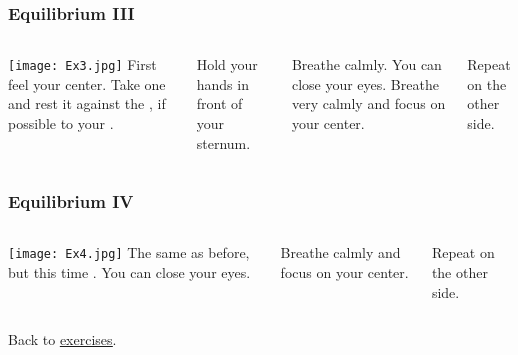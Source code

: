 \begin{frame}
\frametitle{Equilibrium III}


\begin{columns}[c] %
\texttt{[image: Ex3.jpg]}
First feel your center. Take one  
and rest it against the , if possible to your .

Hold your hands in front of your sternum.

Breathe calmly. You can close your eyes. Breathe very calmly and focus on your center.

Repeat on the other side.
\end{columns}
\end{frame}
\begin{frame}
\frametitle{Equilibrium IV}


\begin{columns}[c] %
\texttt{[image: Ex4.jpg]}
The same as before, but this time . You can close your eyes.

Breathe calmly and focus on your center.

Repeat on the other side.
\end{columns}

\vspace{1cm}
Back to \href{run:./Exercises.pdf}{\underline{exercises}}.

\end{frame}

